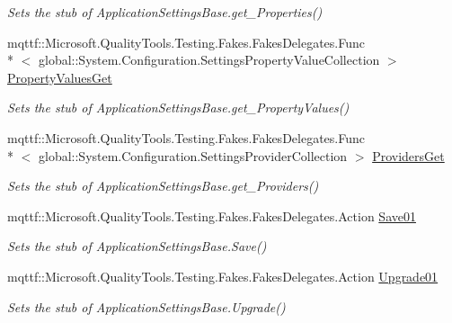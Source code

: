 \begin{DoxyCompactItemize}
\begin{DoxyCompactList}\small\item\em Sets the stub of Application\-Settings\-Base.\-get\-\_\-\-Properties()\end{DoxyCompactList}\item 
mqttf\-::\-Microsoft.\-Quality\-Tools.\-Testing.\-Fakes.\-Fakes\-Delegates.\-Func\\*
$<$ global\-::\-System.\-Configuration.\-Settings\-Property\-Value\-Collection $>$ \hyperlink{class_system_1_1_configuration_1_1_fakes_1_1_stub_application_settings_base_a4f53c7bba92d95314b2b8ca26dc27421}{Property\-Values\-Get}
\begin{DoxyCompactList}\small\item\em Sets the stub of Application\-Settings\-Base.\-get\-\_\-\-Property\-Values()\end{DoxyCompactList}\item 
mqttf\-::\-Microsoft.\-Quality\-Tools.\-Testing.\-Fakes.\-Fakes\-Delegates.\-Func\\*
$<$ global\-::\-System.\-Configuration.\-Settings\-Provider\-Collection $>$ \hyperlink{class_system_1_1_configuration_1_1_fakes_1_1_stub_application_settings_base_a6f05ab3ee8bbd4d13825fbd319e11e18}{Providers\-Get}
\begin{DoxyCompactList}\small\item\em Sets the stub of Application\-Settings\-Base.\-get\-\_\-\-Providers()\end{DoxyCompactList}\item 
mqttf\-::\-Microsoft.\-Quality\-Tools.\-Testing.\-Fakes.\-Fakes\-Delegates.\-Action \hyperlink{class_system_1_1_configuration_1_1_fakes_1_1_stub_application_settings_base_a323850a9c0f6f4a610b9306bcef5047e}{Save01}
\begin{DoxyCompactList}\small\item\em Sets the stub of Application\-Settings\-Base.\-Save()\end{DoxyCompactList}\item 
mqttf\-::\-Microsoft.\-Quality\-Tools.\-Testing.\-Fakes.\-Fakes\-Delegates.\-Action \hyperlink{class_system_1_1_configuration_1_1_fakes_1_1_stub_application_settings_base_af7e73b396a6449ef992e68b67d56958d}{Upgrade01}
\begin{DoxyCompactList}\small\item\em Sets the stub of Application\-Settings\-Base.\-Upgrade()\end{DoxyCompactList}\end{DoxyCompactItemize}
